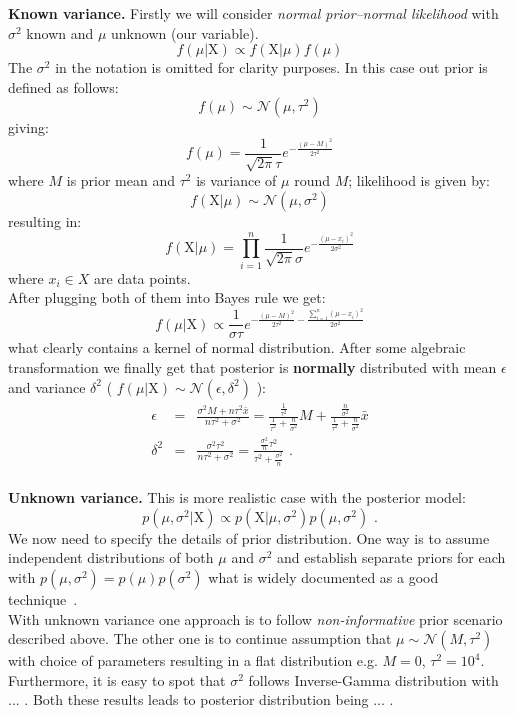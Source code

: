 \documentclass[12pt, a4paper, pdflatex, leqno]{report}
\begin{document}
\textbf{\textrm{Known variance. }}Firstly we will consider \emph{normal prior--normal likelihood} with $\sigma^2$ known and $\mu$ unknown (our variable).
$$
f \left( \mu | \mathrm{X} \right) \propto f \left( \mathrm{X} | \mu \right) f \left( \mu \right)
$$
The $\sigma^2$ in the notation is omitted for clarity purposes. In this case out prior is defined as follows:
$$
f \left( \mu \right)    \sim   \mathcal{N}\left( \mu, \tau^2 \right)
$$
giving:
$$
f \left( \mu \right)    =     \frac{1}{\sqrt{2\pi} \tau} e^{- \frac{{\left( \mu - M \right)}^2}{2 \tau^2} }
$$
where $M$ is prior mean and $\tau^2$ is variance of $\mu$ round $M$; likelihood is given by:
$$
f \left( \mathrm{X} | \mu \right)     \sim    \mathcal{N}\left( \mu, \sigma^2 \right)
$$
resulting in:
$$
f \left( \mathrm{X} | \mu \right)    =     \prod_{i=1}^{n} \frac{1}{\sqrt{2\pi} \sigma} e^{- \frac{{\left( \mu - x_i \right)}^2}{2 \sigma^2} }
$$
where $x_i \in X$ are data points.\\
After plugging both of them into Bayes rule we get:
$$
f \left( \mu | \mathrm{X} \right)     \propto     \frac{1}{\sigma \tau} e^{ -\frac{ {\left( \mu - M \right)}^2 }{2 \tau^2} -\frac{ \sum_{i=1}^{n} {\left( \mu - x_i \right)}^2 }{2 \sigma^2} }
$$
what clearly contains a kernel of normal distribution. After some algebraic transformation we finally get that posterior is \textbf{normally} distributed with mean $\epsilon$ and variance $\delta^2$ ( $f \left( \mu | \mathrm{X} \right) \sim \mathcal{N} \left( \epsilon, \delta^2 \right) $ ):
\begin{eqnarray*}
\epsilon &=& \frac{\sigma^2 M + n \tau^2 \bar{x}}{n \tau^2 + \sigma^2} = \frac{ \frac{1}{\tau^2} }{ \frac{1}{\tau^2} + \frac{n}{\sigma^2} }M + \frac{ \frac{n}{\sigma^2} }{ \frac{1}{\tau^2} + \frac{n}{\sigma^2} } \bar{x} \\
\delta^2 &=& \frac{\sigma^2 \tau^2}{n \tau^2 + \sigma^2} = \frac{ \frac{\sigma^2}{n} \tau^2 }{ \tau^2 + \frac{\sigma^2}{n} } \text{ .}
\end{eqnarray*}
\\

\textbf{\textrm{Unknown variance. }}This is more realistic case with the posterior model:
$$
p \left(  \mu, \sigma^2 | \mathrm{X} \right) \propto p \left( \mathrm{X} | \mu, \sigma^2 \right)    p \left( \mu, \sigma^2 \right) \text{ .}
$$
We now need to specify the details of prior distribution. One way is to assume independent distributions of both $\mu$ and $\sigma^2$ and establish separate priors for each with $p(\mu, \sigma^2) = p(\mu) p(\sigma^2)$ what is widely documented as a good technique~\citep{gelman2003bayesian}.\\
With unknown variance one approach is to follow \emph{non-informative} prior scenario described above. The other one is to continue assumption that $\mu \sim \mathcal{N} \left( M, \tau^2 \right)$ with choice of parameters resulting in a flat distribution e.g. $M=0$, $\tau^2 = 10^4$. Furthermore, it is easy to spot that $\sigma^2$ follows \textrm{Inverse}-\textrm{Gamma} distribution with ... . Both these results leads to posterior distribution being ... .\\
\end{document}
